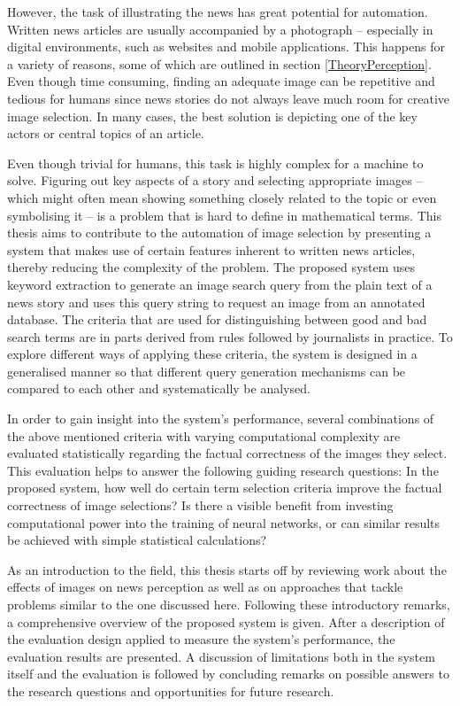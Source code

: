 \documentclass[11pt,a4paper,twoside]{article}
\begin{document}
However, the task of illustrating the news has great potential for automation. Written news articles are usually accompanied by a photograph -- especially in digital environments, such as websites and mobile applications. This happens for a variety of reasons, some of which are outlined in section \ref{TheoryPerception}. Even though time consuming, finding an adequate image can be repetitive and tedious for humans since news stories do not always leave much room for creative image selection. In many cases, the best solution is depicting one of the key actors or central topics of an article.

Even though trivial for humans, this task is highly complex for a machine to solve. Figuring out key aspects of a story and selecting appropriate images -- which might often mean showing something closely related to the topic or even symbolising it -- is a problem that is hard to define in mathematical terms. This thesis aims to contribute to the automation of image selection by presenting a system that makes use of certain features inherent to written news articles, thereby reducing the complexity of the problem. The proposed system uses keyword extraction to generate an image search query from the plain text of a news story and uses this query string to request an image from an annotated database. The criteria that are used for distinguishing between good and bad search terms are in parts derived from rules followed by journalists in practice. To explore different ways of applying these criteria, the system is designed in a generalised manner so that different query generation mechanisms can be compared to each other and systematically be analysed.

In order to gain insight into the system's performance, several combinations of the above mentioned criteria with varying computational complexity are evaluated statistically regarding the factual correctness of the images they select. This evaluation helps to answer the following guiding research questions: In the proposed system, how well do certain term selection criteria improve the factual correctness of image selections? Is there a visible benefit from investing computational power into the training of neural networks, or can similar results be achieved with simple statistical calculations?

\bigskip

As an introduction to the field, this thesis starts off by reviewing work about the effects of images on news perception as well as on approaches that tackle problems similar to the one discussed here. Following these introductory remarks, a comprehensive overview of the proposed system is given. After a description of the evaluation design applied to measure the system's performance, the evaluation results are presented. A discussion of limitations both in the system itself and the evaluation is followed by concluding remarks on possible answers to the research questions and opportunities for future research.
\end{document}
